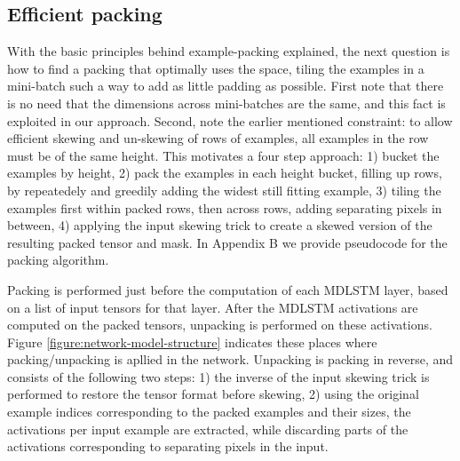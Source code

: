 \documentclass[conference]{IEEEtran}
\renewcommand{\ac}[1]{\gls{#1}}
\newcommand{\EXCLUDE}[1]{}
\begin{document}
\subsection{Efficient packing}

With the basic principles behind example-packing explained, the next question is 
how to find a packing that optimally uses the space, tiling the examples in 
a mini-batch such a way to add as little padding as possible. First note that 
there is no need that the dimensions across mini-batches are the same, and this 
fact is exploited in our approach. Second, note the earlier mentioned constraint:
to allow efficient skewing and un-skewing of rows of examples, all examples in the 
row must be of the same height.\EXCLUDE{\footnote{Relaxing this constraint, example (un)skewing 
must be done for every example separately, and a more complicated packing 
algorithm that considers 2-dimensions is required. We leave this for future work.}}
This motivates a four step approach: 1) bucket the examples by height, 2) 
pack the examples in each height bucket, filling up rows, by repeatedely and greedily 
adding the widest still fitting example, 3) tiling the examples first within packed 
rows, then across rows, adding separating pixels in between, 4) applying the input 
skewing trick to create a skewed version of the resulting packed tensor and mask.
In Appendix B we provide pseudocode for the packing algorithm.


Packing is performed just before the computation of each \ac{MDLSTM} layer, based on a list of input tensors for that layer.
After the \ac{MDLSTM} activations are computed on the packed tensors, unpacking is performed on these activations. Figure 
\ref{figure:network-model-structure} indicates these places where packing/unpacking is apllied in the network.
Unpacking is packing in reverse, and consists of the following two steps: 1) the inverse of the input skewing trick is performed to restore the tensor format before skewing, 2) using the original example indices corresponding to the packed examples and their sizes, 
the activations per input example are extracted, while discarding parts of the activations corresponding to separating pixels 
in the input.
\end{document}
